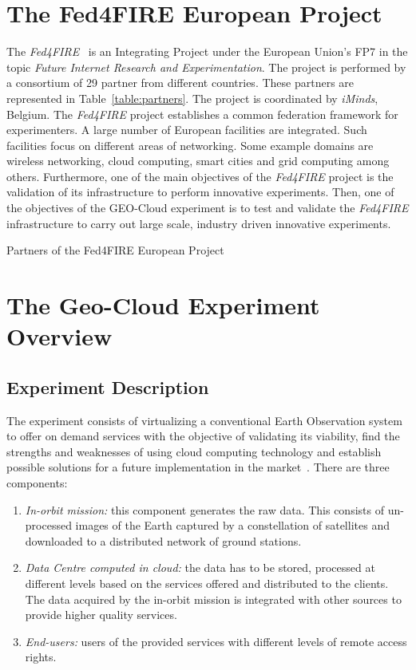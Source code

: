 \section{The Fed4FIRE European Project}%
The \emph{Fed4FIRE}~\cite{Fed4FIRE2014a} is an Integrating Project under the European Union's
\ac{FP7} in the topic \emph{Future
  Internet Research and Experimentation}. The project is performed by a
consortium of 29 partner from different countries. These partners are
represented in Table~\ref{table:partners}. The project is coordinated by
 \emph{iMinds}, Belgium.
The \emph{Fed4FIRE} project establishes a common federation framework for
experimenters. A large  number of European facilities are integrated. Such facilities focus on different  areas
of networking. Some example domains are wireless networking, cloud computing, smart
cities and grid computing among others.
Furthermore, one of the main objectives of the \emph{Fed4FIRE} project is the
validation of its infrastructure to perform
innovative experiments. Then, one of the objectives of the GEO-Cloud experiment
is to test and validate the \emph{Fed4FIRE} infrastructure to carry out large
scale, industry driven innovative experiments.
\begin{table}[hp]
  \centering
  {\small
  
  }
  \caption{Partners of the Fed4FIRE European Project}
  \label{table:partners}
\end{table}

\section{The Geo-Cloud Experiment Overview}


\subsection{Experiment Description}

The experiment consists of virtualizing a conventional Earth Observation system to offer on
demand services with the objective of validating its viability, find
the strengths and weaknesses of using cloud computing technology and establish
possible solutions for a future implementation in the market~\cite{Becedas2014}. There are three
components:
\begin{enumerate}
\item \emph{In-orbit mission:} this component generates the raw data. This
  consists of un-processed images of the Earth captured by a constellation of
  satellites and downloaded to a distributed network of ground stations.
\item \emph{Data Centre computed in cloud:} the data has to be stored, processed at different levels based on the services offered and distributed to the clients. The data acquired by the in-orbit mission is integrated with other sources to provide higher quality services.
\item \emph{End-users:} users of the provided services with different levels of remote access rights.

\end{enumerate}


